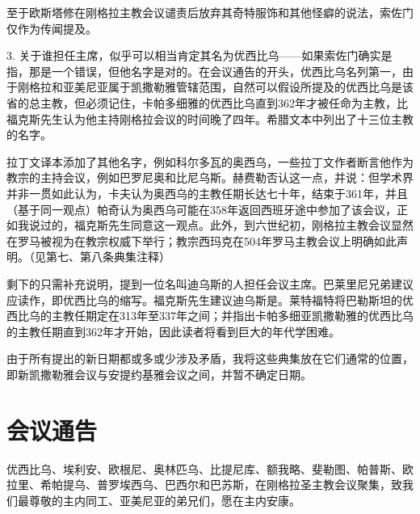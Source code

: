 至于欧斯塔修在刚格拉主教会议谴责后放弃其奇特服饰和其他怪癖的说法，索佐门仅作为传闻提及。\par

3. 关于谁担任主席，似乎可以相当肯定其名为优西比乌——如果索佐门确实是指，那是一个错误，但他名字是对的。在会议通告的开头，优西比乌名列第一，由于刚格拉和亚美尼亚属于凯撒勒雅管辖范围，自然可以假设所提及的优西比乌是该省的总主教，但必须记住，卡帕多细雅的优西比乌直到362年才被任命为主教，比福克斯先生认为他主持刚格拉会议的时间晚了四年。希腊文本中列出了十三位主教的名字。\par

拉丁文译本添加了其他名字，例如科尔多瓦的奥西乌，一些拉丁文作者断言他作为教宗的主持会议，例如巴罗尼奥和比尼乌斯。赫费勒否认这一点，并说：但学术界并非一贯如此认为，卡夫认为奥西乌的主教任期长达七十年，结束于361年，并且（基于同一观点）帕奇认为奥西乌可能在358年返回西班牙途中参加了该会议，正如我说过的，福克斯先生同意这一观点。此外，到六世纪初，刚格拉主教会议显然在罗马被视为在教宗权威下举行；教宗西玛克在504年罗马主教会议上明确如此声明。（见第七、第八条典集注释）\par

剩下的只需补充说明，提到一位名叫迪乌斯的人担任会议主席。巴莱里尼兄弟建议应读作，即优西比乌的缩写。福克斯先生建议迪乌斯是。莱特福特将巴勒斯坦的优西比乌的主教任期定在313年至337年之间；并指出卡帕多细亚凯撒勒雅的优西比乌的主教任期直到362年才开始，因此读者将看到巨大的年代学困难。\par

由于所有提出的新日期都或多或少涉及矛盾，我将这些典集放在它们通常的位置，即新凯撒勒雅会议与安提约基雅会议之间，并暂不确定日期。\par


\section{会议通告}

优西比乌、埃利安、欧根尼、奥林匹乌、比提尼库、额我略、斐勒图、帕普斯、欧拉里、希帕提乌、普罗埃西乌、巴西尔和巴苏斯，在刚格拉圣主教会议聚集，致我们最尊敬的主内同工、亚美尼亚的弟兄们，愿在主内安康。\par

